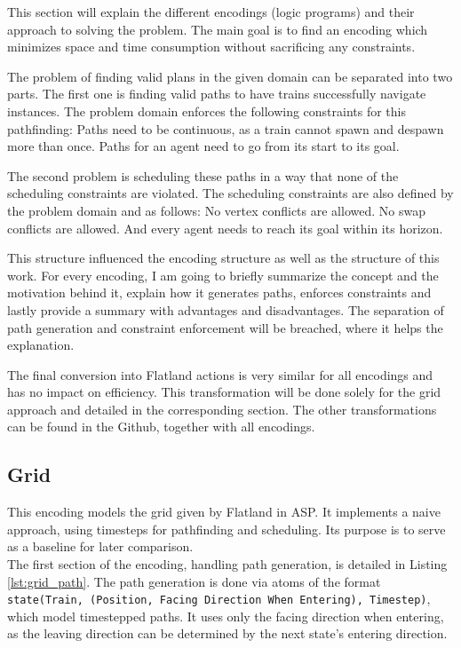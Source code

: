 \documentclass{llncs}
\begin{document}
\begin{multicols*}{2}
This section will explain the different encodings (logic programs) and their approach to solving the problem. The main goal is to find an encoding which minimizes space and time consumption without sacrificing any constraints. 

The problem of finding valid plans in the given domain can be separated into two parts. The first one is finding valid paths to have trains successfully navigate instances. The problem domain enforces the following constraints for this pathfinding: Paths need to be continuous, as a train cannot spawn and despawn more than once. Paths for an agent need to go from its start to its goal.

The second problem is scheduling these paths in a way that none of the scheduling constraints are violated. The scheduling constraints are also defined by the problem domain and as follows: No vertex conflicts are allowed. No swap conflicts are allowed. And every agent needs to reach its goal within its horizon.

This structure influenced the encoding structure as well as the structure of this work. For every encoding, I am going to briefly summarize the concept and the motivation behind it, explain how it generates paths, enforces constraints and lastly provide a summary with advantages and disadvantages. The separation of path generation and constraint enforcement will be breached, where it helps the explanation.

The final conversion into Flatland actions is very similar for all encodings and has no impact on efficiency. This transformation will be done solely for the grid approach and detailed in the corresponding section. The other transformations can be found in the Github\cite{Git24}, together with all encodings.

\subsection*{Grid}
\begin{figure}[t]
    
\end{figure}

This encoding models the grid given by Flatland in ASP. It implements a naive approach, using timesteps for pathfinding and scheduling. Its purpose is to serve as a baseline for later comparison.\\

The first section of the encoding, handling path generation, is detailed in Listing \ref{lst:grid_path}. The path generation is done via atoms of the format \texttt{state(Train, (Position, Facing Direction When Entering), Timestep)}, which model timestepped paths. It uses only the facing direction when entering, as the leaving direction can be determined by the next state's entering direction.


\end{multicols*}
\end{document}

